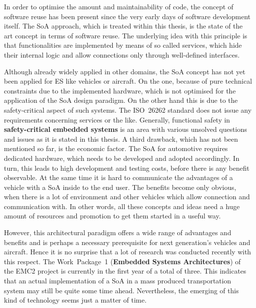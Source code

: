 In order to optimise the amount and maintainability of code, the concept of software reuse has been present since the very early days of software development itself. The SoA approach, which is treated within this thesis, is the state of the art concept in terms of software reuse. The underlying idea with this principle is that functionalities are implemented by means of so called services, which hide their internal logic and allow connections only through well-defined interfaces.

Although already widely applied in other domains, the SoA concept has not yet been applied for ES like vehicles or aircraft. On the one, because of pure technical constraints due to the implemented hardware, which is not optimised for the application of the SoA design paradigm. On the other hand this is due to the safety-critical aspect of such systems. The \mbox{ISO 26262} standard does not issue any requirements concerning services or the like. Generally, functional safety in \textbf{safety-critical embedded systems} is an area with various unsolved questions and issues as it is stated in this thesis. A third drawback, which has not been mentioned so far, is the economic factor. The SoA for automotive requires dedicated hardware, which needs to be developed and adopted accordingly. In turn, this leads to high development and testing costs, before there is any benefit observable. At the same time it is hard to communicate the advantages of a vehicle with a SoA inside to the end user. The benefits become only obvious, when there is a lot of environment and other vehicles which allow connection and communication with. In other words, all these concepts and ideas need a huge amount of resources and promotion to get them started in a useful way.

However, this architectural paradigm offers a wide range of advantages and benefits and is perhaps a necessary prerequisite for next generation's vehicles and aircraft. Hence it is no surprise that a lot of research was conducted recently with this respect. The \mbox{Work Package 1} (\textbf{Embedded Systems Architectures}) of the EMC2 project is currently in the first year of a total of three. This indicates that an actual implementation of a SoA in a mass produced transportation system may still be quite some time ahead. Nevertheless, the emerging of this kind of technology seems just a matter of time.